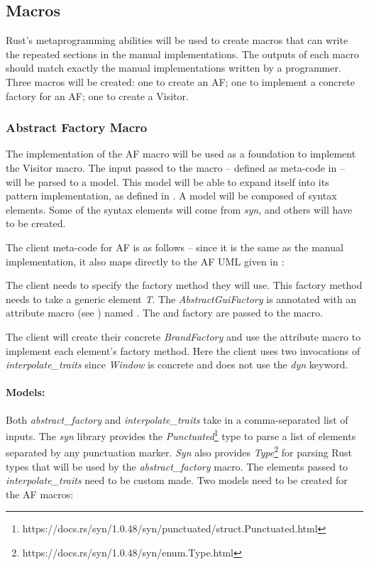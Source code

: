 \subsection{Macros}
Rust's metaprogramming abilities will be used to create macros that can write the repeated sections in the manual implementations.
The outputs of each macro should match exactly the manual implementations written by a programmer.
Three macros will be created: one to create an AF; one to implement a concrete factory for an AF; one to create a Visitor.

\subsubsection{Abstract Factory Macro}
The implementation of the AF macro will be used as a foundation to implement the Visitor macro.
The input passed to the macro -- defined as meta-code in  -- will be parsed to a model.
This model will be able to expand itself into its pattern implementation, as defined in .
A model will be composed of syntax elements.
Some of the syntax elements will come from \textit{syn}, and others will have to be created.

The client meta-code for AF is as follows -- since it is the same as the manual implementation, it also maps directly to the AF UML given in :


The client needs to specify the factory method they will use.
This factory method needs to take a generic element \textit{T}.
The \textit{AbstractGuiFactory} is annotated with an attribute macro (see ) named .
The  and factory  are passed to the macro.

The client will create their concrete \textit{BrandFactory} and use the  attribute macro to implement each element's factory method.
Here the client uses two invocations of \textit{interpolate\_traits} since \textit{Window} is concrete and does not use the \textit{dyn} keyword.

\paragraph{Models:}
Both \textit{abstract\_factory} and \textit{interpolate\_traits} take in a comma-separated list of inputs.
The \textit{syn} library provides the \textit{Punctuated}\footnote{https://docs.rs/syn/1.0.48/syn/punctuated/struct.Punctuated.html} type to parse a list of elements separated by any punctuation marker.
\textit{Syn} also provides \textit{Type}\footnote{https://docs.rs/syn/1.0.48/syn/enum.Type.html} for parsing Rust types that will be used by the \textit{abstract\_factory} macro.
The elements passed to \textit{interpolate\_traits} need to be custom made.
Two models need to be created for the AF macros:

